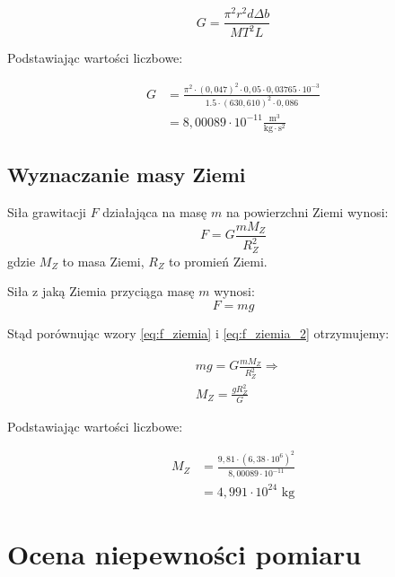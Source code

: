 \documentclass[a4paper,12pt]{article}
\begin{document}
\begin{equation*}
    G = \frac{\pi^2 r^2 d \Delta b}{MT^2L}
\end{equation*}

Podstawiając wartości liczbowe:

\begin{align*}
    G & = \frac{\pi^2 \cdot (0{,}047)^2 \cdot 0{,}05 \cdot 0{,}03765 \cdot 10^{-3}}{
    1.5 \cdot (630{,}610)^2 \cdot 0{,}086}                                           \\
      & = 8{,}00089 \cdot 10^{-11} \frac{\text{m}^3}{\text{kg} \cdot \text{s}^2}
\end{align*}


\subsection{Wyznaczanie masy Ziemi}

Siła grawitacji $F$ działająca na masę $m$ na powierzchni Ziemi wynosi:
\begin{equation}
    \label{eq:f_ziemia}
    F = G \frac{mM_Z}{R_Z^2}
\end{equation}
gdzie $M_Z$ to masa Ziemi, $R_Z$ to promień Ziemi.

Siła z jaką Ziemia przyciąga masę $m$ wynosi:
\begin{equation}
    \label{eq:f_ziemia_2}
    F = mg
\end{equation}

Stąd porównując wzory \eqref{eq:f_ziemia} i \eqref{eq:f_ziemia_2} otrzymujemy:

\begin{align*}
     & mg = G \frac{mM_Z}{R_Z^2} \Rightarrow \\
     & M_Z = \frac{gR_Z^2}{G}
\end{align*}

Podstawiając wartości liczbowe:

\begin{align*}
    M_Z & = \frac{9{,}81 \cdot (6{,}38 \cdot 10^6)^2}{8{,}00089 \cdot 10^{-11}} \\
        & = 4{,}991 \cdot 10^{24} \text{ kg}
\end{align*}



\section{Ocena niepewności pomiaru}
\end{document}
